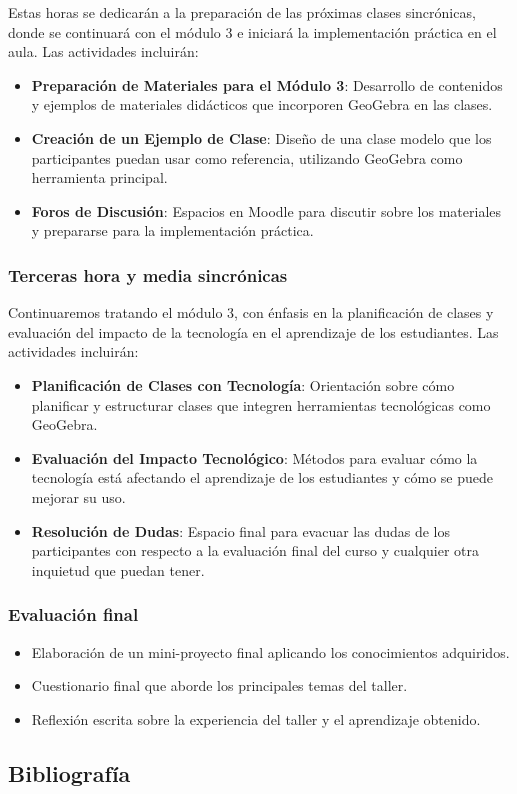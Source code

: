 Estas horas se dedicarán a la preparación de las próximas clases sincrónicas, donde se continuará con el módulo 3 e iniciará la implementación práctica en el aula. Las actividades incluirán:

\begin{itemize}
	\item \textbf{Preparación de Materiales para el Módulo 3}: Desarrollo de contenidos y ejemplos de materiales didácticos que incorporen GeoGebra en las clases.
	\item \textbf{Creación de un Ejemplo de Clase}: Diseño de una clase modelo que los participantes puedan usar como referencia, utilizando GeoGebra como herramienta principal.
	\item \textbf{Foros de Discusión}: Espacios en Moodle para discutir sobre los materiales y prepararse para la implementación práctica.
\end{itemize}

\subsubsection{Terceras hora y media sincrónicas}

Continuaremos tratando el módulo 3, con énfasis en la planificación de clases y evaluación del impacto de la tecnología en el aprendizaje de los estudiantes. Las actividades incluirán:

\begin{itemize}
	\item \textbf{Planificación de Clases con Tecnología}: Orientación sobre cómo planificar y estructurar clases que integren herramientas tecnológicas como GeoGebra.
	\item \textbf{Evaluación del Impacto Tecnológico}: Métodos para evaluar cómo la tecnología está afectando el aprendizaje de los estudiantes y cómo se puede mejorar su uso.
	\item \textbf{Resolución de Dudas}: Espacio final para evacuar las dudas de los participantes con respecto a la evaluación final del curso y cualquier otra inquietud que puedan tener.
\end{itemize}

\subsubsection{Evaluación final}

\begin{itemize}
	\item Elaboración de un mini-proyecto final aplicando los conocimientos adquiridos.
	\item Cuestionario final que aborde los principales temas del taller.
	\item Reflexión escrita sobre la experiencia del taller y el aprendizaje obtenido.
\end{itemize}

\subsection{Bibliografía}

\nocite{*}
\printbibliography[keyword={03}]